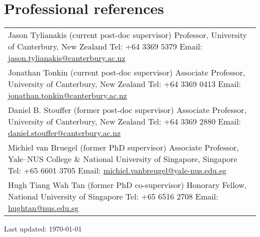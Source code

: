 \documentclass[a4paper]{article}
\def\footerlink{}
\begin{document}
\section*{Professional references}
\begin{tabular}{p{\linewidth}}
Jason Tylianakis (current post-doc supervisor) \newline
Professor, University of Canterbury, New Zealand \newline 
Tel: +64 3369 5379 \newline 
Email: \url{jason.tylianakis@canterbury.ac.nz} \\

Jonathan Tonkin (current post-doc supervisor) \newline 
Associate Professor, University of Canterbury, New Zealand \newline 
Tel: +64 3369 0413 \newline 
Email: \url{jonathan.tonkin@canterbury.ac.nz} \\

Daniel B. Stouffer (former post-doc supervisor) \newline 
Associate Professor, University of Canterbury, New Zealand \newline 
Tel: +64 3369 2880 \newline 
Email: \url{daniel.stouffer@canterbury.ac.nz} \\

Michiel van Bruegel (former PhD supervisor) \newline 
Associate Professor, Yale--NUS College \& National University of Singapore, Singapore \newline 
Tel: +65 6601 3705 \newline 
Email: \url{michiel.vanbreugel@yale-nus.edu.sg} \\

Hugh Tiang Wah Tan (former PhD co-supervisor) \newline 
Honorary Fellow, National University of Singapore \newline
Tel: +65 6516 2708 \newline 
Email: \url{hughtan@nus.edu.sg} \\

\end{tabular}

\vfill
\begin{center}
  \begin{footnotesize}
    Last updated: \today \\
    \href{\footerlink}{\texttt{\footerlink}}
  \end{footnotesize}
\end{center}
\end{document}
